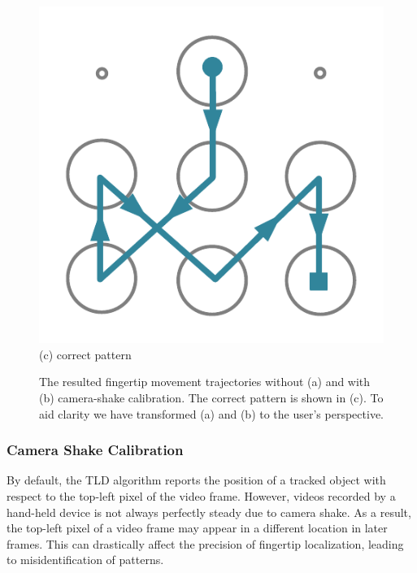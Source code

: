 \begin{figure}[!t]
{\begin{minipage}[b]{0.18\textwidth}
            \includegraphics[width=\textwidth]{fig/5-3.pdf}\\
            \centering \footnotesize (c) correct pattern
            \end{minipage}
        }
        \caption{The resulted fingertip movement trajectories without (a) and with (b) camera-shake calibration.  The correct pattern is shown in (c). To aid clarity we have transformed (a) and (b) to the user's perspective.}
        \label{fig:camera_shake_illu}
       \vspace{-2mm}
         \end{figure}

        \subsubsection{Camera Shake Calibration}
        \label{secction:shake}
         By default, the TLD algorithm reports the position of a tracked object with respect to the top-left pixel of the video frame.
         However, videos recorded by a hand-held device is not always perfectly steady due to
        camera shake. As a result, the top-left pixel of a video frame may appear in a different location in later frames.
        This can drastically affect the precision of fingertip localization, leading to misidentification of patterns.

